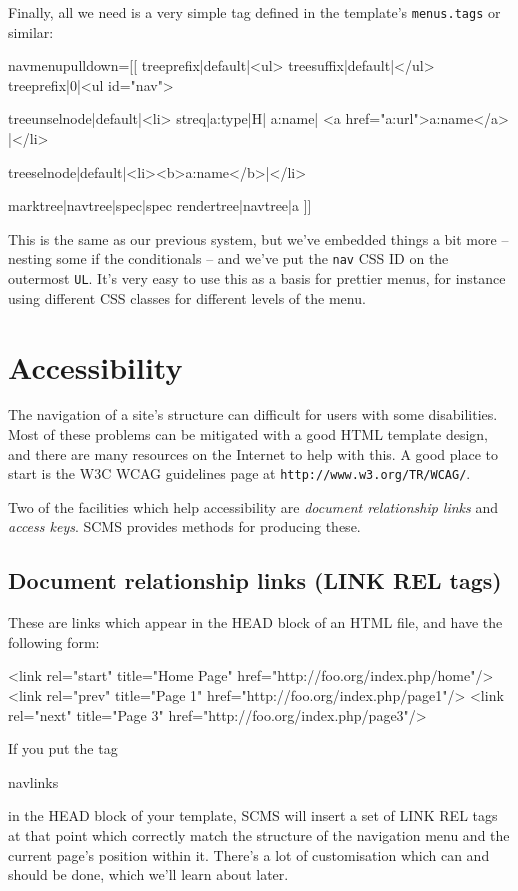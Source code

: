 Finally, all we need is a very simple tag defined in the template's 
\texttt{menus.tags} or similar:
\begin{MyVerbatim2}
navmenupulldown=[[
{{treeprefix|default|<ul>}}
{{treesuffix|default|</ul>}}
{{treeprefix|0|<ul id="nav">}}

{{treeunselnode|default|<li>
    {{streq|{{a:type}}|H|
        {{a:name}}|
        <a href="{{a:url}}">{{a:name}}</a>
    }}|</li>
}}

{{treeselnode|default|<li><b>{{a:name}}</b>|</li>}}

{{marktree|{{navtree}}|spec|{{spec}}}}
{{rendertree|{{navtree}}|a}}
]]
\end{MyVerbatim2}
This is the same as our previous system, but we've embedded things a bit more
-- nesting some if the conditionals -- and we've put the \texttt{nav} CSS ID
on the outermost \texttt{UL}. It's very easy to use this as a basis for
prettier menus, for instance using different CSS classes for different levels
of the menu.

\section{Accessibility}
The navigation of a site's structure can difficult for users with some
disabilities. Most of these problems can be mitigated with 
a good HTML template design, and there are many resources on the Internet
to help with this. A good place to start is the W3C WCAG guidelines page
at \texttt{http://www.w3.org/TR/WCAG/}.

Two of the facilities which help accessibility are \emph{document relationship links}
and \emph{access keys}. SCMS provides methods for producing these.

\subsection{Document relationship links (LINK REL tags)}
\label{linkreltags}
These are links which appear in the HEAD block of an HTML file, and have
the following form:
\begin{MyVerbatim}
<link rel="start" title="Home Page" href="http://foo.org/index.php/home"/>
<link rel="prev" title="Page 1" href="http://foo.org/index.php/page1"/>
<link rel="next" title="Page 3" href="http://foo.org/index.php/page3"/>
\end{MyVerbatim}
If you put the tag
\begin{MyVerbatim}
{{navlinks}}
\end{MyVerbatim}
in the HEAD block of your template, SCMS will insert a set of LINK REL
tags at that point which correctly match the structure of the navigation
menu and the current page's position within it. There's a lot of customisation which
can and should be done, which we'll learn about later.

